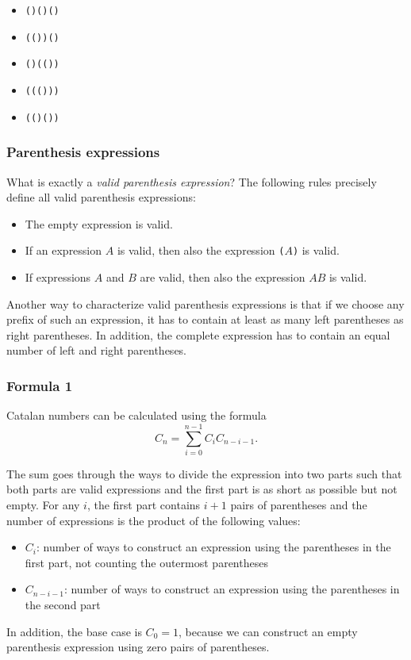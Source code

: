 \begin{itemize}[noitemsep]
\item \texttt{()()()}
\item \texttt{(())()}
\item \texttt{()(())}
\item \texttt{((()))}
\item \texttt{(()())}
\end{itemize}

\subsubsection{Parenthesis expressions}


What is exactly a \emph{valid parenthesis expression}?
The following rules precisely define all
valid parenthesis expressions:

\begin{itemize}
\item The empty expression is valid.
\item If an expression $A$ is valid,
then also the expression
\texttt{(}$A$\texttt{)} is valid.
\item If expressions $A$ and $B$ are valid,
then also the expression $AB$ is valid.
\end{itemize}

Another way to characterize valid 
parenthesis expressions is that if
we choose any prefix of such an expression,
it has to contain at least as many left
parentheses as right parentheses.
In addition, the complete expression has to
contain an equal number of left and right
parentheses.

\subsubsection{Formula 1}

Catalan numbers can be calculated using the formula
\[ C_n = \sum_{i=0}^{n-1} C_{i} C_{n-i-1}.\]

The sum goes through the ways to divide the
expression into two parts
such that both parts are valid
expressions and the first part is as short as possible
but not empty.
For any $i$, the first part contains $i+1$ pairs
of parentheses and the number of expressions
is the product of the following values:

\begin{itemize}
\item $C_{i}$: number of ways to construct an expression
using the parentheses in the first part,
not counting the outermost parentheses
\item $C_{n-i-1}$: number of ways to construct an
expression using the parentheses in the second part
\end{itemize}
In addition, the base case is $C_0=1$,
because we can construct an empty parenthesis
expression using zero pairs of parentheses.

